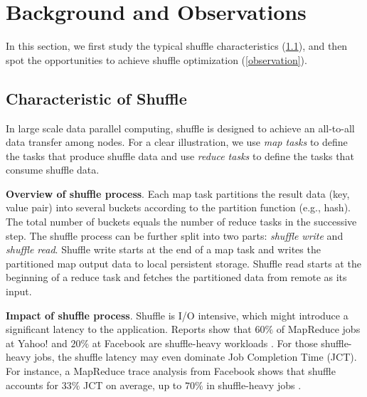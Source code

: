 \section{Background and Observations}

In this section, we first study the typical shuffle characteristics (\ref{shuffle pattern}), and then spot the opportunities to achieve shuffle optimization (\ref{observation}).
\subsection{Characteristic of Shuffle} \label{shuffle pattern}

In large scale data parallel computing, shuffle is designed to achieve an all-to-all data transfer among nodes. 
For a clear illustration, we use \textit{map tasks} to define the tasks that produce shuffle data and use \textit{reduce tasks} to define the tasks that consume shuffle data.

\textbf{Overview of shuffle process}. 
Each map task partitions the result data (key, value pair) into several buckets according to the partition function (e.g., hash). 
The total number of buckets equals the number of reduce tasks in the successive step.
The shuffle process can be further split into two parts: \textit{shuffle write} and \textit{shuffle read}. 
Shuffle write starts at the end of a map task and writes the partitioned map output data to local persistent storage. 
Shuffle read starts at the beginning of a reduce task and fetches the partitioned data from remote as its input. 

\textbf{Impact of shuffle process}. Shuffle is I/O intensive, which might introduce a significant latency to the application. 
Reports show that $60\%$ of MapReduce jobs at Yahoo! and $20\%$ at Facebook are shuffle-heavy workloads \cite{shufflewatcher}. 
For those shuffle-heavy jobs, the shuffle latency may even dominate Job Completion Time (JCT).
For instance, a MapReduce trace analysis from Facebook shows that shuffle accounts for $33\%$ JCT on average, up to $70\%$ in shuffle-heavy jobs \cite{managing}.

